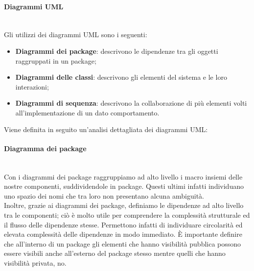 			\paragraph*{Diagrammi UML}\mbox{}\\ [1mm]
			Gli utilizzi dei diagrammi UML sono i seguenti:
			\begin{itemize}
				\item \textbf{Diagrammi dei package}: descrivono le dipendenze tra gli oggetti raggruppati in un package;
				\item \textbf{Diagrammi delle classi}: descrivono gli elementi del sistema e le loro interazioni;
				\item \textbf{Diagrammi di sequenza}: descrivono la collaborazione di più elementi volti all'implementazione di un dato comportamento.
			\end{itemize}
			Viene definita in seguito un'analisi dettagliata dei diagrammi UML:
			\paragraph*{Diagramma dei package}\mbox{}\\ [1mm]
			Con i diagrammi dei package raggruppiamo ad alto livello i macro insiemi delle nostre componenti, suddividendole in package. Questi ultimi infatti individuano uno spazio dei nomi che tra loro non presentano alcuna ambiguità. \\
			Inoltre, grazie ai diagrammi dei package, definiamo le dipendenze ad alto livello tra le componenti; ciò è molto utile per comprendere la complessità strutturale ed il flusso delle dipendenze stesse. Permettono infatti di individuare circolarità ed elevata complessità delle dipendenze in modo immediato.
			È importante definire che all'interno di un package gli elementi che hanno visibilità pubblica possono essere visibili anche all'esterno del package stesso mentre quelli che hanno visibilità privata, no.
